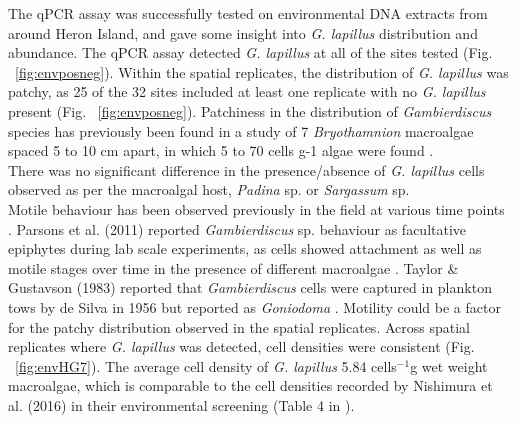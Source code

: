 \documentclass[12pt]{article}
\begin{document}
The qPCR assay was successfully tested on environmental DNA extracts from around Heron Island, and gave some insight into \emph{G. lapillus} distribution and abundance. 
The qPCR assay detected \emph{G. lapillus} at all of the sites tested (Fig. ~\ref{fig:envposneg}). 
Within the spatial replicates, the distribution of \emph{G. lapillus} was patchy, as 25 of the 32 sites included at least one replicate with no \textit{G. lapillus} present (Fig. ~\ref{fig:envposneg}). 
Patchiness in the distribution of \textit{Gambierdiscus} species has previously been found in a study of 7 \emph{Bryothamnion} macroalgae spaced 5 to 10 cm apart, in which 5 to 70 cells g-1 algae were found \citep{taylor1986underwater}.\\
There was no significant difference in the presence/absence of \emph{G. lapillus} cells observed as per the macroalgal host, \emph{Padina} sp. or \emph{Sargassum} sp.\\
Motile behaviour has been observed previously in the field at various time points \citep{yasumoto1977finding,bomber1987ecology}. 
Parsons et al. (2011) reported \emph{Gambierdiscus} sp. behaviour as facultative epiphytes during lab scale experiments, as cells showed attachment as well as motile stages over time in the presence of different macroalgae \citep{parsons2011examination}. 
Taylor \& Gustavson (1983) reported that \emph{Gambierdiscus} cells were captured in plankton tows by de Silva in 1956 but reported as \emph{Goniodoma} \citep{taylor1986underwater}.
Motility could be a factor for the patchy distribution observed in the spatial replicates. 
Across spatial replicates where \emph{G. lapillus} was detected, cell densities were consistent (Fig. ~\ref{fig:envHG7}). 
The average cell density of \emph{G. lapillus} 5.84 cells$^{-1}$g wet weight macroalgae, which is comparable to the cell densities recorded by Nishimura et al. (2016) in their environmental screening (Table 4 in \citep{nishimura2016quantitative}).\\
\end{document}
